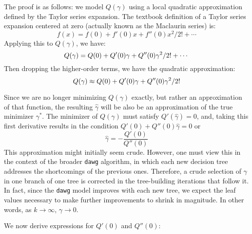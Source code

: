 \documentclass{article}
\begin{document}
The proof is as follows: we model $Q(\gamma)$ using a local quadratic
approximation defined by the Taylor series expansion.  The textbook
definition of a Taylor series expansion centered at zero (actually
known as the Maclaurin series) is:
\[
f(x) = f(0) + f'(0)x + f''(0)x^2/2! + \cdots
\]
Applying this to $Q(\gamma)$, we have:
\begin{equation*}
Q(\gamma) = Q(0) + Q'(0)\gamma + Q''(0)\gamma^2/2! + \cdots \\
\end{equation*}
Then dropping the higher-order terms, we have the quadratic
approximation:
\begin{equation}
Q(\gamma) \approx Q(0) + Q'(0)\gamma + Q''(0)\gamma^2/2! \\
\label{Q-quad}
\end{equation}

Since we are no longer minimizing $Q(\gamma)$ exactly, but rather an
approximation of that function, the resulting $\hat \gamma$ will be
also be an approximation of the true minimizer $\gamma^*$.  The
minimizer of $Q(\gamma)$ must satisfy $Q'(\hat \gamma)=0$, and, taking
this first derivative results in the condition $Q'(0) + Q''(0)\hat
\gamma = 0$ or
\[
\hat \gamma = -\frac{ Q'(0) }{ Q''(0) }
\]
This approximation might initially seem crude. However, one must view
this in the context of the broader \texttt{dawg} algorithm, in which each new
decision tree addresses the shortcomings of the previous ones.
Therefore, a crude selection of $\gamma$ in one branch of one tree is
corrected in the tree-building iterations that follow it.  In fact,
since the \texttt{dawg} model improves with each new tree, we expect the leaf
values necessary to make further improvements to shrink in magnitude.
In other words, as $k \rightarrow \infty$, $\gamma \rightarrow 0$.

We now derive expressions for $Q'(0)$ and $Q''(0)$:
\end{document}
